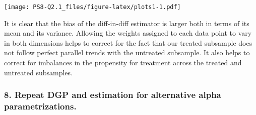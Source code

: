 \documentclass[
]{article}
\begin{document}
\texttt{[image: PS8-Q2.1\_files/figure-latex/plots1-1.pdf]}

It is clear that the bias of the diff-in-diff estimator is larger both
in terms of its mean and its variance. Allowing the weights assigned to
each data point to vary in both dimensions helps to correct for the fact
that our treated subsample does not follow perfect parallel trends with
the untreated subsample. It also helps to correct for imbalances in the
propensity for treatment across the treated and untreated subsamples.

\hypertarget{repeat-dgp-and-estimation-for-alternative-alpha-parametrizations.}{%
\subsubsection{8. Repeat DGP and estimation for alternative alpha
parametrizations.}\label{repeat-dgp-and-estimation-for-alternative-alpha-parametrizations.}}
\end{document}
